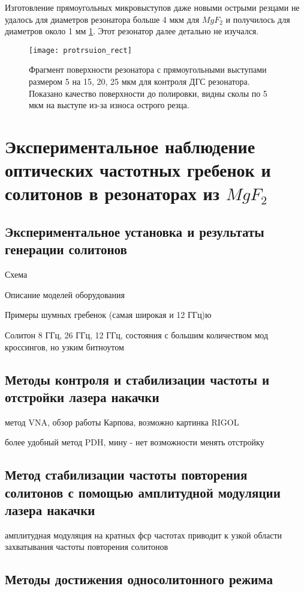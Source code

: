 Изготовление прямоугольных микровыступов даже новыми острыми резцами не удалось для диаметров резонатора больше 4 мкм для $MgF_2$ и получилось для диаметров около 1 мм \ref{protrsuion_rect}. Этот резонатор далее детально не изучался.

\begin{figure}[ht]
\centering
  \texttt{[image: protrsuion\_rect]}
  \caption{Фрагмент поверхности резонатора с прямоугольными выступами размером 5 на 15, 20, 25 мкм для контроля ДГС резонатора. Показано качество поверхности до полировки, видны сколы по 5 мкм на выступе из-за износа острого резца.}
  \label{protrsuion_rect}
\end{figure}

\section{Экспериментальное наблюдение оптических частотных гребенок и солитонов в резонаторах из $MgF_2$}


\subsection{Экспериментальное установка и результаты генерации солитонов}

Схема

Описание моделей оборудования

Примеры шумных гребенок (самая широкая и 12 ГГц)ю

Солитон 8 ГГц, 26 ГГц, 12 ГГц, состояния с большим количеством мод кроссингов, но узким битноутом

\subsection{Методы контроля и стабилизации частоты и отстройки лазера накачки}
метод VNA, обзор работы Карпова, возможно картинка RIGOL

более удобный метод PDH, мину - нет возможности менять отстройку

\subsection{Метод стабилизации частоты повторения солитонов с помощью амплитудной модуляции лазера накачки}
амплитудная модуляция на кратных фср частотах приводит к узкой области захватывания частоты повторения солитонов

\subsection{Методы достижения односолитонного режима}

